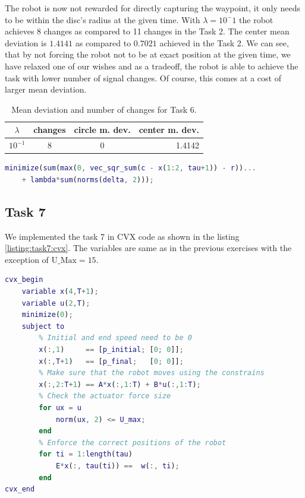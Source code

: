 The robot is now not rewarded for directly capturing the waypoint, it only needs to be within the disc's radius at the given time. With $\lambda=10^-1$ the robot achieves 8 changes as compared to 11 changes in the Task 2. The center mean deviation is $1.4141$ as compared to $0.7021$ achieved in the Task 2. We can see, that by not forcing the robot not to be at exact position at the given time, we have relaxed one of our wishes and as a tradeoff, the robot is able to achieve the task with lower number of signal changes. Of course, this comes at a cost of larger mean deviation.


\begin{table}[!htb]
    \label{table:task6:table}
    \begin{tabular}{c|ccr}
        $\lambda$ & changes & circle m. dev. & center m. dev. \\
        \hline
        $10^{-1}$ & 8 & 0 & 1.4142
    \end{tabular}
    \centering
    \caption{Mean deviation and number of changes for Task 6.}
\end{table}

\begin{lstlisting}[language=Matlab, caption=CVX code for task 6., label=listing:task6:cvx, float=!htb]
minimize(sum(max(0, vec_sqr_sum(c - x(1:2, tau+1)) - r))...
    + lambda*sum(norms(delta, 2)));
\end{lstlisting}


\subsection{Task 7}

We implemented the task 7 in CVX code as shown in the listing \ref{listing:task7:cvx}. The variables are same as in the previous exercises with the exception of $\text{U\_Max}=15$.

\begin{lstlisting}[language=Matlab, caption=CVX code for task 7., label=listing:task7:cvx, float=!htb]
cvx_begin
    variable x(4,T+1);
    variable u(2,T);
    minimize(0);
    subject to
        % Initial and end speed need to be 0
        x(:,1)     == [p_initial; [0; 0]];
        x(:,T+1)   == [p_final;   [0; 0]];
        % Make sure that the robot moves using the constrains
        x(:,2:T+1) == A*x(:,1:T) + B*u(:,1:T);
        % Check the actuator force size
        for ux = u
            norm(ux, 2) <= U_max; 
        end
        % Enforce the correct positions of the robot
        for ti = 1:length(tau)
            E*x(:, tau(ti)) ==  w(:, ti);
        end
cvx_end
\end{lstlisting}

